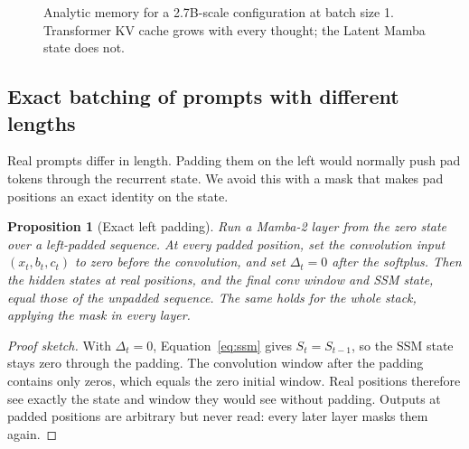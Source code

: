 \documentclass[10pt]{article}
\newtheorem{proposition}{Proposition}
\begin{document}
\begin{figure}[t]
\centering
{}
\caption{Analytic memory for a 2.7B-scale configuration at batch size 1. Transformer KV cache grows with every thought; the Latent Mamba state does not.}
\label{fig:memory}
\end{figure}

\subsection{Exact batching of prompts with different lengths}

Real prompts differ in length. Padding them on the left would normally push pad tokens through the recurrent state. We avoid this with a mask that makes pad positions an exact identity on the state.

\begin{proposition}[Exact left padding]\label{prop:padding}
Run a Mamba-2 layer from the zero state over a left-padded sequence. At every padded position, set the convolution input $(x_t, b_t, c_t)$ to zero before the convolution, and set $\Delta_t = 0$ after the softplus. Then the hidden states at real positions, and the final conv window and SSM state, equal those of the unpadded sequence. The same holds for the whole stack, applying the mask in every layer.
\end{proposition}
\begin{proof}[Proof sketch]
With $\Delta_t = 0$, Equation~\eqref{eq:ssm} gives $S_t = S_{t-1}$, so the SSM state stays zero through the padding. The convolution window after the padding contains only zeros, which equals the zero initial window. Real positions therefore see exactly the state and window they would see without padding. Outputs at padded positions are arbitrary but never read: every later layer masks them again.
\end{proof}
\end{document}
